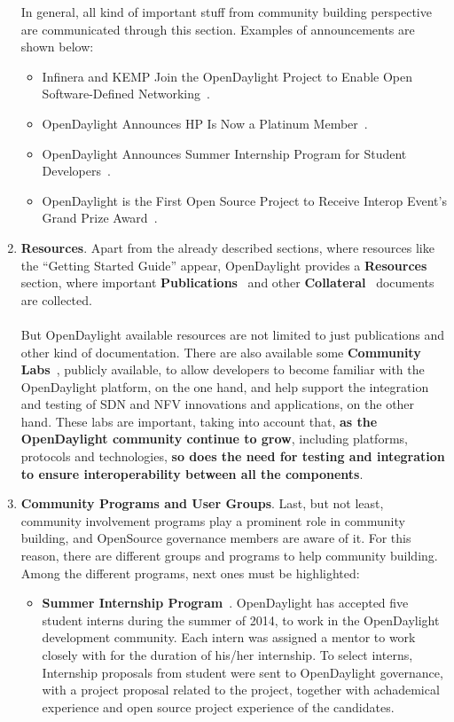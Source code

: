 \documentclass[a4paper, 12pt]{book}
\begin{document}
\begin{enumerate}
\begin{itemize}
\end{itemize}
In general, all kind of important stuff from community building perspective are communicated through this section. Examples of announcements are shown below:
\begin{itemize}\itemsep0pt
\item{Infinera and KEMP Join the OpenDaylight Project to Enable Open Software-Defined Networking}~\cite{OpenDaylightAnnouncement01}.
\item{OpenDaylight Announces HP Is Now a Platinum Member}~\cite{OpenDaylightAnnouncement02}.
\item{OpenDaylight Announces Summer Internship Program for Student Developers}~\cite{OpenDaylightAnnouncement03}.
\item{OpenDaylight is the First Open Source Project to Receive Interop Event’s Grand Prize Award}~\cite{OpenDaylightAnnouncement04}.
\end{itemize}
\item{\textbf{Resources}}. Apart from the already described sections, where resources like the ``Getting Started Guide'' appear, OpenDaylight provides a \textbf{Resources~\cite{Resources}} section, where important \textbf{Publications}~\cite{OpenDaylightPublications} and other \textbf{Collateral}~\cite{OpenDaylightCollateral} documents are collected.\\
\\
But OpenDaylight available resources are not limited to just publications and other kind of documentation. There are also available some \textbf{Community Labs}~\cite{OpenDaylightCommunityLabs}, publicly available, to allow developers to become familiar with the OpenDaylight platform, on the one hand, and help support the integration and testing of SDN and NFV innovations and applications, on the other hand. These labs are important, taking into account that, \textbf{as the OpenDaylight community continue to grow}, including platforms, protocols and technologies, \textbf{so does the need for testing and integration to ensure interoperability between all the components}.
\item{\textbf{Community Programs and User Groups}}. Last, but not least, community involvement programs play a prominent role in community building, and OpenSource governance members are aware of it. For this reason, there are different groups and programs to help community building. Among the different programs, next ones must be highlighted:
\begin{itemize}\itemsep0pt
\item{\textbf{Summer Internship Program}~\cite{OpenDaylightInternshipProgram}}. OpenDaylight has accepted five student interns during the summer of 2014, to work in the OpenDaylight development community. Each intern was assigned a mentor to work closely with for the duration of his/her internship. To select interns, Internship proposals from student were sent to OpenDaylight governance, with a project proposal related to the project, together with achademical experience and open source project experience of the candidates.

\end{itemize}
\end{enumerate}
\end{document}
